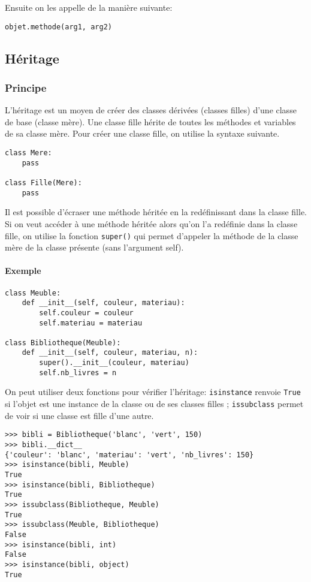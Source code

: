 Ensuite on les appelle de la manière suivante:
\begin{verbatim}
objet.methode(arg1, arg2)
\end{verbatim}


\subsection{Héritage}

\subsubsection{Principe}

L'héritage est un moyen de créer des classes dérivées (classes filles) d'une classe de base (classe mère). Une classe fille hérite de toutes les méthodes et variables de sa classe mère. Pour créer une classe fille, on utilise la syntaxe suivante.

\begin{verbatim}
class Mere:
    pass

class Fille(Mere):
    pass
\end{verbatim}

Il est possible d'écraser une méthode héritée en la redéfinissant dans la classe fille. Si on veut accéder à une méthode héritée alors qu'on l'a redéfinie dans la classe fille, on utilise la fonction \texttt{super()} qui permet d'appeler la méthode de la classe mère de la classe présente (sans l'argument self).

\paragraph{Exemple}
\begin{verbatim}
class Meuble:
    def __init__(self, couleur, materiau):
        self.couleur = couleur
        self.materiau = materiau

class Bibliotheque(Meuble):
    def __init__(self, couleur, materiau, n):
        super().__init__(couleur, materiau)
        self.nb_livres = n
\end{verbatim}
On peut utiliser deux fonctions pour vérifier l'héritage: \texttt{isinstance} renvoie \texttt{True} si l'objet est une instance de la classe ou de ses classes filles ; \texttt{issubclass} permet de voir si une classe est fille d'une autre.

\begin{verbatim}
>>> bibli = Bibliotheque('blanc', 'vert', 150)
>>> bibli.__dict__
{'couleur': 'blanc', 'materiau': 'vert', 'nb_livres': 150}
>>> isinstance(bibli, Meuble)
True
>>> isinstance(bibli, Bibliotheque)
True
>>> issubclass(Bibliotheque, Meuble)
True
>>> issubclass(Meuble, Bibliotheque)
False
>>> isinstance(bibli, int)
False
>>> isinstance(bibli, object)
True
\end{verbatim}

